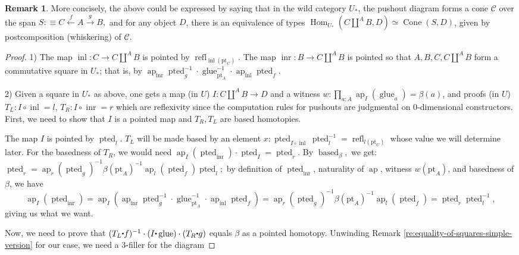 \documentclass{amsart}
\theoremstyle{definition}
\newtheorem{re}[theorem]{Remark}
\newcommand{\ap}{\operatorname{ap}}
\newcommand{\refl}{\operatorname{refl}}
\newcommand{\inl}{\operatorname{inl}}
\newcommand{\inr}{\operatorname{inr}}
\newcommand{\glue}{\operatorname{glue}}
\newcommand{\depfun}[2]{\prod\limits_{#1}^{}{#2}}
\newcommand{\bs}[1]{\mathrm{pt}_{#1}}
\newcommand{\ptd}[1]{\operatorname{pted}_{#1}}
\newcommand{\bsd}[1]{\operatorname{based}_{#1}}
\newcommand{\whisk}{\raisebox{0.5ex}{$\displaystyle\centerdot$}}
\begin{document}
\begin{re}
    More concisely, the above could be expressed by saying that in the wild category $U_*$, the pushout diagram forms a cone $\mathcal{C}$ over the span $S :\equiv C \xleftarrow{f} A \xrightarrow{g} B,$ and for any object $D$, there is an equivalence of types $ \operatorname{Hom}_{U_*}(C \coprod^A B, D) \simeq \operatorname{Cone}(S, D)$, given by postcomposition (whiskering) of $\mathcal{C}$.
\end{re}
\begin{proof}
    1) The map $\inl: C \to C \coprod^A B$ is pointed by $\refl_{\inl({\bs{C}})}$.
    The map $\inr: B \to C \coprod^A B$ is pointed so that $A, B, C, C \coprod^A B$ form a commutative square in $U_*$; that is, by $\ap_{\inr}{\ptd{g}^{-1}} \cdot \glue_{\bs{A}}^{-1} \cdot \ap_{\inl} \ptd{f}.$

    2) Given a square in $U_*$ as above,
    one gets a map (in $U$) $I: C \coprod^A B \to D$
    and a witness $w: \depfun{a:A}{\ap_I(\glue_a) = \beta(a)}$,
    and proofs (in $U$) $T_L: I \circ \inl = l$, $T_R: I \circ \inr = r$ which are reflexivity since the computation rules for pushouts are judgmental on 0-dimensional constructors. First, we need to show that $I$ is a pointed map and $T_R, T_L$ are based homotopies.

    The map $I$ is pointed by $\ptd{l}$. $T_L$ will be made based by an element $x: \ptd{I \circ \inl} \ptd{l}^{-1} = \refl_{l(\bs{C})}$ whose value we will determine later. For the basedness of $T_R$, we would need $\ap_I (\ptd{\inr}) \cdot \ptd{I} = \ptd{r}$.
    By $\bsd{\beta},$ we get:
    $\ptd{r} = \ap_r(\ptd{g})^{-1} \beta({\bs{A}})^{-1} \ap_ l({\ptd{f}}) \ptd{l};$
    by definition of $\ptd{\inr}$, naturality of $\ap$, witness $w(\bs{A})$, and basedness of $\beta$, we have
    $$\ap_I (\ptd{\inr}) = \ap_I (\ap_{\inr}{\ptd{g}^{-1}} \cdot \glue_{\bs{A}}^{-1} \cdot \ap_{\inl} \ptd{f}) = \ap_r(\ptd{g})^{-1} \beta(\bs{A})^{-1} \ap_l(\ptd{f}) = \ptd{r} \ptd{l}^{-1},$$
    giving us what we want.

    Now, we need to prove that $(T_L \whisk f)^{-1} \cdot (I \whisk \glue) \cdot (T_R \whisk g)$ equals $\beta$ as a pointed homotopy. Unwinding Remark \ref{re:equality-of-squares-simple-version} for our case, we need a 3-filler for the diagram


\end{proof}
\end{document}
